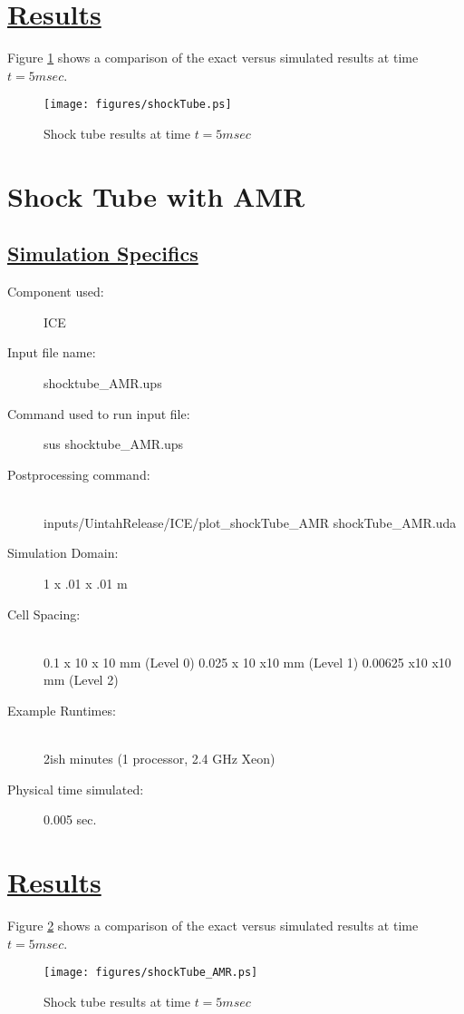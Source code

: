 \documentclass[fleqn]{article}
\begin{document}
\section*{\underline{Results}}
Figure \ref{results.ST} shows a comparison of the exact versus simulated results at time $t = 5msec$.
\begin{figure}
\texttt{[image: figures/shockTube.ps]}
\caption{Shock tube results at time $t = 5msec$}
\label{results.ST}
\end{figure}
\newpage


\section*{\center Shock Tube with AMR}
 
\subsection*{\underline{Simulation Specifics}}
\begin{description} 
\item [Component used:] \hfill ICE
\item [Input file name:] \hfill shocktube\_AMR.ups
\item [Command used to run input file:]\hfill sus shocktube\_AMR.ups
\item [Postprocessing command:]\hfill \\
inputs/UintahRelease/ICE/plot\_shockTube\_AMR shockTube\_AMR.uda

\item [Simulation Domain:]\hfill    1 x .01 x .01 m
\item [Cell Spacing:]\hfill \\ 
0.1 x 10 x 10 mm (Level 0)
0.025 x 10 x10 mm (Level 1)
0.00625 x10 x10 mm (Level 2)


\item [Example Runtimes:] \hfill \\
 2ish minutes   (1 processor, 2.4 GHz Xeon)

\item [Physical time simulated:] \hfill 0.005 sec.

\end{description}

\section*{\underline{Results}}
Figure \ref{results.ST.AMR} shows a comparison of the exact versus simulated results at time $t = 5msec$.
\begin{figure}
\texttt{[image: figures/shockTube\_AMR.ps]}
\caption{Shock tube results at time $t = 5msec$}
\label{results.ST.AMR}
\end{figure}
\newpage
\end{document}
